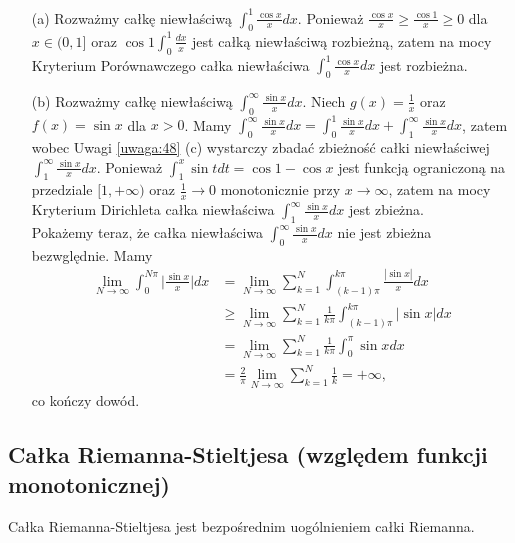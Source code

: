 \documentclass[leqno]{article}
\begin{document}
\begin{justify}
\begin{ex}
\begin{itemize}
    \item [(a)]
        Rozważmy całkę niewłaściwą $\int_{0}^{1}\frac{\cos x}{x}dx$. Ponieważ $\frac{\cos x}{x} \geqslant \frac{\cos1}{x} \geqslant 0$ dla $x \in (0, 1]$ oraz $\cos 1 \int_{0}^{1}\frac{dx}{x}$ jest całką niewłaściwą rozbieżną, zatem na mocy Kryterium Porównawczego całka niewłaściwa $\int_{0}^{1}\frac{\cos x}{x}dx$ jest rozbieżna. 
    \item [(b)]
        Rozważmy całkę niewłaściwą $\int_{0}^{\infty}\frac{\sin x}{x}dx$. Niech $g(x) = \frac{1}{x}$ oraz $f(x) = \sin x$ dla $x > 0$. Mamy $\int_{0}^{\infty}\frac{\sin x}{x}dx = \int_{0}^{1}\frac{\sin x}{x}dx + \int_{1}^{\infty}\frac{\sin x}{x}dx$, zatem wobec Uwagi \ref{uwaga:48} (c) wystarczy zbadać zbieżność całki niewłaściwej $\int_{1}^{\infty}\frac{\sin x}{x}dx$. Ponieważ $\int_{1}^{x}\sin t dt = \cos1 - \cos x$ jest funkcją ograniczoną na przedziale $[1, +\infty)$ oraz $\frac{1}{x} \to 0$ monotonicznie przy $x \to \infty$, zatem na mocy Kryterium Dirichleta całka niewłaściwa $\int_{1}^{\infty}\frac{\sin x}{x}dx$ jest zbieżna. \\
        Pokażemy teraz, że całka niewłaściwa $\int_{0}^{\infty}\frac{\sin x}{x}dx$ nie jest zbieżna bezwględnie. Mamy
        \begin{align*}
            \lim\limits_{N \to \infty}\int_{0}^{N\pi}\Big|\frac{\sin x}{x}\Big|dx &= \lim\limits_{N \to \infty} \sum_{k=1}^{N}\int_{(k-1)\pi}^{k\pi}\frac{|\sin x|}{x}dx \\
            & \geqslant \lim\limits_{N \to \infty}\sum_{k=1}^{N}\frac{1}{k\pi}\int_{(k-1)\pi} ^{k \pi}|\sin x|dx \\
            &= \lim\limits_{N \to \infty}\sum_{k=1}^{N}\frac{1}{k\pi}\int_{0}^{\pi}\sin x dx \\
            &= \frac{2}{\pi}\lim\limits_{N \to \infty}\sum_{k=1}^{N}\frac{1}{k} = +\infty,
        \end{align*}
        co kończy dowód.
\end{itemize}
\end{ex}

\subsection{Całka Riemanna-Stieltjesa (względem funkcji monotonicznej)}
Całka Riemanna-Stieltjesa jest bezpośrednim uogólnieniem całki Riemanna.


\end{justify}
\end{document}
